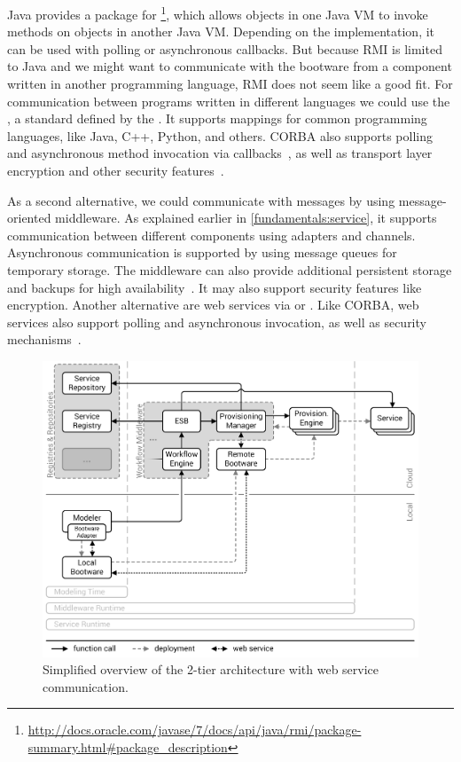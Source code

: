 Java provides a package for \footnote{\url{http://docs.oracle.com/javase/7/docs/api/java/rmi/package-summary.html\#package_description}}, which allows objects in one Java VM to invoke methods on objects in another Java VM.
Depending on the implementation, it can be used with polling or asynchronous callbacks.
But because RMI is limited to Java and we might want to communicate with the bootware from a component written in another programming language, RMI does not seem like a good fit.
For communication between programs written in different languages we could use the , a standard defined by the .
It supports mappings for common programming languages, like Java, C++, Python, and others.
CORBA also supports polling and asynchronous method invocation via callbacks~\autocite{corba:async}, as well as transport layer encryption and other security features~\autocite{corba:security}.

As a second alternative, we could communicate with messages by using message-oriented middleware.
As explained earlier in \autoref{fundamentals:service}, it supports communication between different components using adapters and channels.
Asynchronous communication is supported by using message queues for temporary storage.
The middleware can also provide additional persistent storage and backups for high availability~\autocite{mom}.
It may also support security features like encryption.
Another alternative are web services via  or .
Like CORBA, web services also support polling and asynchronous invocation, as well as security mechanisms~\autocite{ws:security}.

\begin{figure}[!htbp]
	\centering
	\includegraphics[resolution=600]{design/assets/webservice}
	\caption{Simplified overview of the 2-tier architecture with web service communication.}
	\label{image:webservice}
\end{figure}

